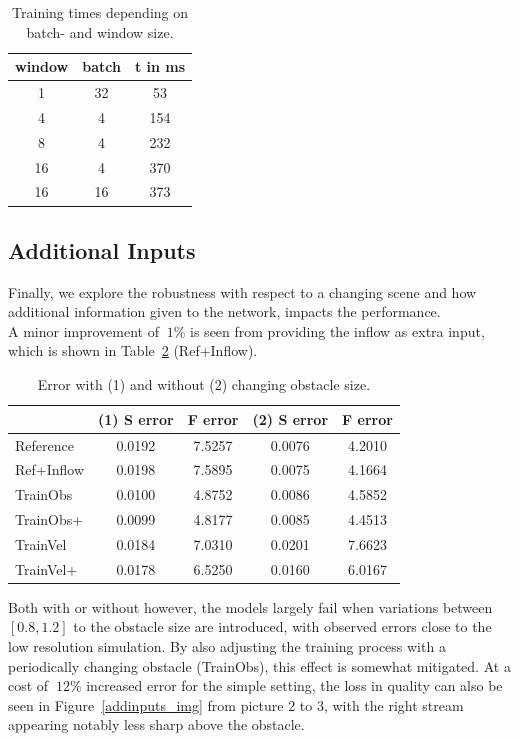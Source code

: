 \documentclass[sigconf]{acmart}
\begin{document}
\begin{table}
	\centering
	\caption{Training times depending on batch- and window size.}
	\label{tab:bwsize}
	\begin{tabular}{ccc}
		\hline
		window  & batch  & t in ms \\ \hline
		1  & 32 &   53    \\
		4  & 4  &   154   \\
		8  & 4  &   232   \\
		16 & 4  &   370   \\
		16 & 16 &   373   \\ \hline
	\end{tabular}
\end{table}
\subsection{Additional Inputs}
Finally, we explore the robustness with respect to a changing scene and how additional information given to the network, impacts the performance. \\ 
A minor improvement of $~1\%$ is seen from providing the inflow as extra input, which is shown in Table~\ref{tab:errobs} (Ref+Inflow).
\begin{table}
	\centering
	\caption{Error with (1) and without (2) changing obstacle size.}
	\label{tab:errobs}
	\begin{tabular}{lcccc}
		\hline
		& (1) S error & F error & (2) S error & F error \\ \hline
		Reference  &   0.0192    & 7.5257  &   0.0076    & 4.2010  \\
		Ref+Inflow &   0.0198    & 7.5895  &   0.0075    & 4.1664  \\
		TrainObs     &   0.0100    & 4.8752  &   0.0086    & 4.5852  \\
		TrainObs+    &   0.0099    & 4.8177  &   0.0085    & 4.4513  \\
		TrainVel   &   0.0184    & 7.0310  &   0.0201    & 7.6623  \\
		TrainVel+  &   0.0178    & 6.5250  &   0.0160    & 6.0167  \\ \hline
	\end{tabular}
\end{table}
Both with or without however, the models largely fail when variations between $[0.8,1.2]$ to the obstacle size are introduced, with observed errors close to the low resolution simulation.
By also adjusting the training process with a periodically changing obstacle (TrainObs), this effect is somewhat mitigated. At a cost of $~12\%$ increased error for the simple setting, the loss in quality can also be seen in Figure~\ref{addinputs_img} from picture 2 to 3, with the right stream appearing notably less sharp above the obstacle.
\end{document}
